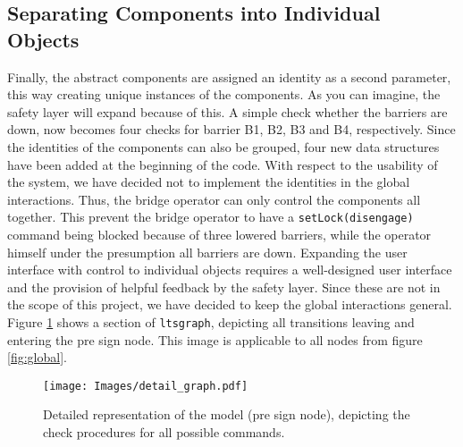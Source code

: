 \subsection{Separating Components into Individual Objects}
\label{sec:ids}
Finally, the abstract components are assigned an  identity as a second parameter, this way creating unique instances of the components. As you can imagine, the safety layer will expand because of this. A simple check whether the barriers are down, now becomes four checks for barrier B1, B2, B3 and B4, respectively. Since the identities of the components can also be grouped, four new data structures have been added at the beginning of the code. With respect to the usability of the system, we have decided not to implement the identities in the global interactions. Thus, the bridge operator can only control the components all together. This prevent the bridge operator to have a \texttt{setLock(disengage)} command being blocked because of three lowered barriers, while the operator himself under the presumption all barriers are down. Expanding the user interface with control to individual objects requires a well-designed user interface and the provision of helpful feedback by the safety layer. Since these are not in the scope of this project, we have decided to keep the global interactions general. Figure \ref{fig:detailed} shows a section of \texttt{ltsgraph}, depicting all transitions leaving and entering the pre sign node. This image is applicable to all nodes from figure \ref{fig:global}.
%
\begin{figure}[htb]
\centering
\texttt{[image: Images/detail\_graph.pdf]}
\caption{Detailed representation of the model (pre sign node), depicting the check procedures for all possible commands.}%
\label{fig:detailed}
\end{figure}%
%

